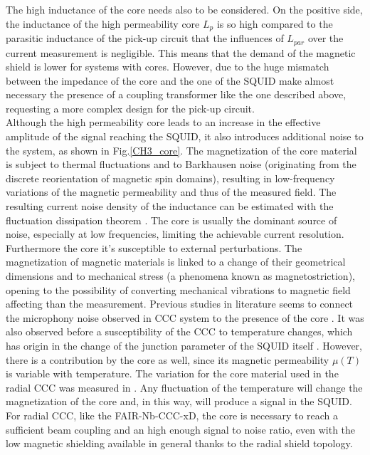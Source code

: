 \documentclass[12pt,a4paper]{report}
\begin{document}
       The high inductance of the core needs also to be considered. On the positive side, the inductance of the high permeability core $L_p$ is so high compared to the parasitic inductance of the pick-up circuit that the influences of $L_{par}$ over the current measurement is negligible. This means that the demand of the magnetic shield is lower for systems with cores. However, due to the huge mismatch between the impedance of the core and the one of the SQUID make almost necessary the presence of a coupling transformer like the one described above, requesting a more complex design for the pick-up circuit. \\
       Although the high permeability core leads to an increase in the effective amplitude of the signal reaching the SQUID, it also introduces additional noise to the system, as shown in Fig.\ref{CH3_core}. The magnetization of the core material is subject to thermal fluctuations and to Barkhausen noise (originating from the discrete reorientation of magnetic spin domains), resulting in low-frequency variations of the magnetic permeability and thus of the measured field. The resulting current noise density of the inductance can be estimated with the fluctuation dissipation theorem \cite{Geithner_CCC} \cite{Geithner_core}. The core is usually the dominant source of noise, especially at low frequencies, limiting the achievable current resolution. Furthermore the core it's susceptible to external perturbations. The magnetization of magnetic materials is linked to a change of their geometrical dimensions and to mechanical stress (a phenomena known as magnetostriction), opening to the possibility of converting mechanical vibrations to magnetic field affecting than the measurement. Previous studies in literature seems to connect the microphony noise observed in CCC system to the presence of the core \cite{Geithner_core}. It was also observed before a susceptibility of the CCC to temperature changes, which has origin in the change of the junction parameter of the SQUID itself \cite{Squid_handbook_1}. However, there is a contribution by the core as well, since its magnetic permeability \(\mu(T)\) is variable with temperature. The variation for the core material used in the radial CCC was measured in \cite{Tympel:IBIC2016} . Any fluctuation of the temperature will change the magnetization of the core and, in this way, will produce a signal in the SQUID.
       For radial CCC, like the FAIR-Nb-CCC-xD, the core is necessary to reach a sufficient beam coupling and an high enough signal to noise ratio, even with the low magnetic shielding available in general thanks to the radial shield topology.
\end{document}
